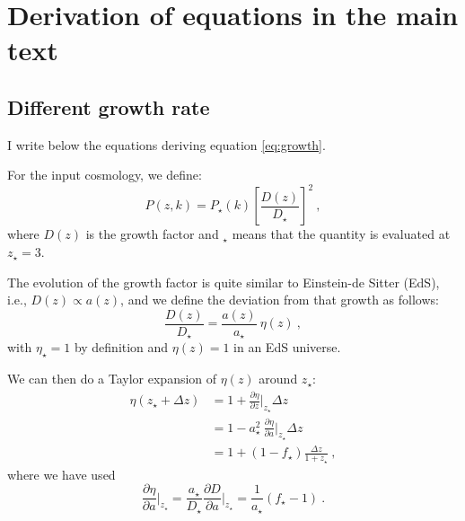 \section{Derivation of equations in the main text} \label{app:eq}


\subsection{Different growth rate}

I write below the equations deriving equation \ref{eq:growth}.

For the input cosmology, we define:
\begin{equation}
 P(z,k) = P_\star(k) \left[ \frac{D(z)}{D_\star} \right]^2 ~,
\end{equation}
where $D(z)$ is the growth factor and $_\star$ means that the quantity is 
evaluated at $z_\star=3$. 

The evolution of the growth factor is quite similar to Einstein-de Sitter 
(EdS), i.e., $D(z) \propto a(z)$, and we define the deviation from that growth 
as follows:
\begin{equation}
 \frac{D(z)}{D_\star} = \frac{a(z)}{a_\star} ~ \eta(z) ~,
\end{equation}
with $\eta_\star=1$ by definition and $\eta(z)=1$ in an EdS universe.

We can then do a Taylor expansion of $\eta(z)$ around $z_\star$:
\begin{align}
 \eta(z_\star+\Delta z) 
  & = 1 + \frac{\partial \eta}{\partial z} 
      \Bigr\rvert_{z_\star} \Delta z                    \nonumber \\
  & = 1 - a_\star^2~\frac{\partial \eta}{\partial a} 
      \Bigr\rvert_{z_\star} \Delta z                    \nonumber \\
  & = 1 + \left( 1 - f_\star \right) \frac{\Delta z}{1+z_\star} ~,
\end{align}
where we have used 
\begin{equation}
 \frac{\partial \eta}{\partial a} \Bigr\rvert_{z_\star} 
  = \frac{a_\star}{D_\star} \frac{\partial D}{\partial a} \Bigr\rvert_{z_\star}
  = \frac{1}{a_\star} \left( f_\star - 1 \right) ~.
\end{equation}

